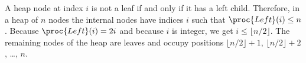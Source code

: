 A heap node at index $i$ is not a leaf if and only if it has a left child.
Therefore, in a heap of $n$ nodes the internal nodes have indices $i$ such that $\proc{Left}(i)\le n$.
Because $\proc{Left}(i)=2i$ and because $i$ is integer, we get $i\le\lfloor n/2\rfloor$.
The remaining nodes of the heap are leaves and occupy positions $\lfloor n/2\rfloor+1$, $\lfloor n/2\rfloor+2$, \dots, $n$.
